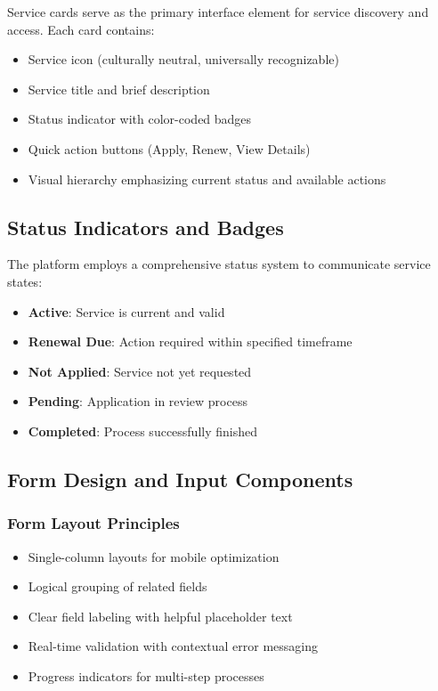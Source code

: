 \documentclass[12pt,a4paper]{article}
\begin{document}
Service cards serve as the primary interface element for service discovery and access. Each card contains:

\begin{itemize}
    \item Service icon (culturally neutral, universally recognizable)
    \item Service title and brief description
    \item Status indicator with color-coded badges
    \item Quick action buttons (Apply, Renew, View Details)
    \item Visual hierarchy emphasizing current status and available actions
\end{itemize}

\subsection{Status Indicators and Badges}

The platform employs a comprehensive status system to communicate service states:

\begin{itemize}
    \item \textbf{\textcolor{success}{Active}}: Service is current and valid
    \item \textbf{\textcolor{warning}{Renewal Due}}: Action required within specified timeframe
    \item \textbf{\textcolor{destructive}{Not Applied}}: Service not yet requested
    \item \textbf{Pending}: Application in review process
    \item \textbf{Completed}: Process successfully finished
\end{itemize}

\subsection{Form Design and Input Components}

\subsubsection{Form Layout Principles}

\begin{itemize}
    \item Single-column layouts for mobile optimization
    \item Logical grouping of related fields
    \item Clear field labeling with helpful placeholder text
    \item Real-time validation with contextual error messaging
    \item Progress indicators for multi-step processes
\end{itemize}
\end{document}
